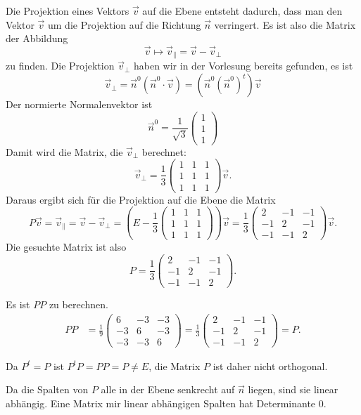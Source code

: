 \begin{loesung}
\begin{teilaufgaben}
\item
Die Projektion eines Vektors $\vec v$ auf die Ebene entsteht dadurch, dass man
den Vektor $\vec v$ um die Projektion auf die Richtung $\vec n$ verringert.
Es ist also die Matrix der Abbildung
\[
\vec v\mapsto \vec v_{\|} = \vec v - \vec v_{\perp}
\]
zu finden.
Die Projektion $\vec v_{\perp}$ haben wir in der Vorlesung bereits gefunden, es ist
\[
\vec v_{\perp}
=
\vec n^0
(\vec n^0\cdot \vec v)
=
(\vec n^0(\vec n^0)^t)\vec v
\]
Der normierte Normalenvektor ist
\[
\vec n^0 =\frac1{\sqrt{3}}\begin{pmatrix}1\\1\\1\end{pmatrix}
\]
Damit wird die Matrix, die $\vec v_{\perp}$ berechnet:
\[
\vec v_{\perp}
=
\frac13\begin{pmatrix}
1&1&1\\
1&1&1\\
1&1&1
\end{pmatrix}
\vec v.
\]
Daraus ergibt sich für die Projektion auf die Ebene die Matrix
\[
P\vec v
=
\vec v_{\|}
=
\vec v-\vec v_{\perp}
=
\left(E-
\frac13\begin{pmatrix}
1&1&1\\
1&1&1\\
1&1&1
\end{pmatrix}\right)
\vec v
=
\frac13
\begin{pmatrix}
 2&-1&-1\\
-1& 2&-1\\
-1&-1& 2
\end{pmatrix}
\vec v.
\]
Die gesuchte Matrix ist also
\[
P=
\frac13
\begin{pmatrix}
 2&-1&-1\\
-1& 2&-1\\
-1&-1& 2
\end{pmatrix}.
\]
\item
Es ist $PP$ zu berechnen.
\begin{align*}
PP
&=
\frac19
\begin{pmatrix}
 6&-3&-3\\
-3& 6&-3\\
-3&-3& 6
\end{pmatrix}
=
\frac13
\begin{pmatrix}
 2&-1&-1\\
-1& 2&-1\\
-1&-1& 2
\end{pmatrix}
=P.
\end{align*}
\item
Da $P^t=P$ ist $P^tP=PP=P\ne E$, die Matrix $P$ ist daher nicht
orthogonal.
\item
Da die Spalten von $P$ alle in der Ebene senkrecht auf $\vec n$ liegen,
sind sie linear abhängig. 
Eine Matrix mir linear abhängigen Spalten hat Determinante $0$.
\end{teilaufgaben}
\end{loesung}

